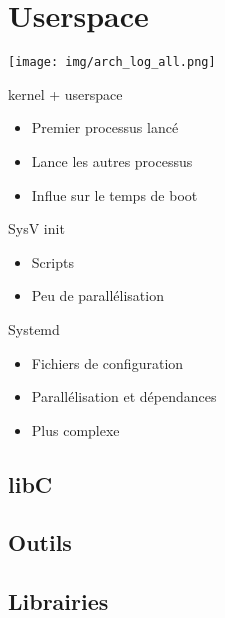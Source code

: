 \section{Userspace}
	\begin{frame}
		\texttt{[image: img/arch\_log\_all.png]}
		\caption{kernel + userspace}
	\end{frame}
	\begin{frame}
		\begin{itemize}
			\item Premier processus lancé
			\item Lance les autres processus
			\item Influe sur le temps de boot
		\end{itemize}
		\begin{block}{SysV init}
			\begin{itemize}
				\item Scripts
				\item Peu de parallélisation
			\end{itemize}
		\end{block}
		\begin{block}{Systemd}
			\begin{itemize}
				\item Fichiers de configuration
				\item Parallélisation et dépendances
				\item Plus complexe
			\end{itemize}
		\end{block}
	\end{frame}

\subsection{libC}
\subsection{Outils}
\subsection{Librairies}
